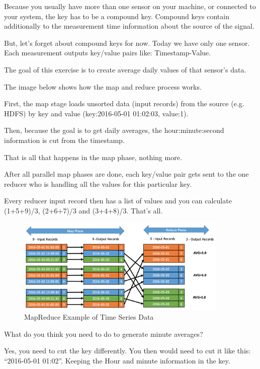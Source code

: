 \documentclass[12pt, numbers=noenddot]{scrreprt} %
\begin{document}
Because you usually have more than one sensor on your machine, or connected to your system, the key has to be a compound key. Compound keys contain additionally to the measurement time information about the source of the signal.

But, let’s forget about compound keys for now. Today we have only one sensor. Each measurement outputs key/value pairs like: Timestamp-Value.

The goal of this exercise is to create average daily values of that sensor’s data.

The image below shows how the map and reduce process works.

First, the map stage loads unsorted data (input records) from the source (e.g. HDFS) by key and value (key:2016-05-01 01:02:03, value:1).

Then, because the goal is to get daily averages, the hour:minute:second information is cut from the timestamp.

That is all that happens in the map phase, nothing more.

After all parallel map phases are done, each key/value pair gets sent to the one reducer who is handling all the values for this particular key.

Every reducer input record then has a list of values and you can calculate (1+5+9)/3, (2+6+7)/3 and (3+4+8)/3. That’s all.

\begin{figure}[htbp]
  \centering
     \includegraphics[width=0.9\textwidth]{images/MapReduce-Time-Series-example}
  \caption{MapReduce Example of Time Series Data}
  \label{fig:Bild1}
\end{figure}

What do you think you need to do to generate minute averages?

Yes, you need to cut the key differently. You then would need to cut it like this: “2016-05-01 01:02”. Keeping the Hour and minute information in the key.
\end{document}
